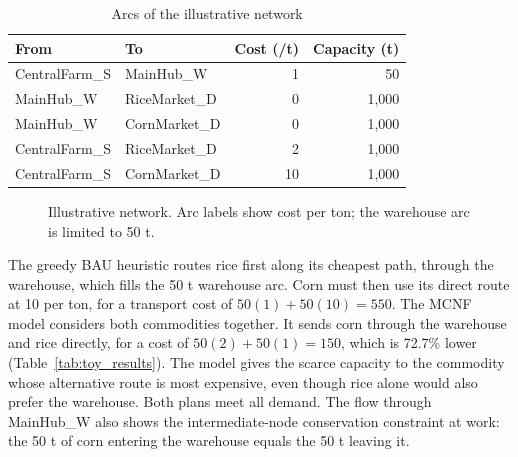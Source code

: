 \documentclass{icsthesis}
\begin{document}
\begin{mainmatter}
\begin{table}[H]
\caption{Arcs of the illustrative network}
\label{tab:toy_edges}
\centering
\small
\setlength{\tabcolsep}{3pt}
\begin{tabular}{llrr}
\hline
From & To & Cost (/t) & Capacity (t) \\
\hline
CentralFarm\_S & MainHub\_W & 1 & 50 \\
MainHub\_W & RiceMarket\_D & 0 & 1,000 \\
MainHub\_W & CornMarket\_D & 0 & 1,000 \\
CentralFarm\_S & RiceMarket\_D & 2 & 1,000 \\
CentralFarm\_S & CornMarket\_D & 10 & 1,000 \\
\hline
\end{tabular}
\end{table}

\begin{figure}[H]
\centering
{}
\caption{Illustrative network. Arc labels show cost per ton; the warehouse arc is limited to 50 t.}
\label{fig:toy}
\end{figure}

The greedy BAU heuristic routes rice first along its cheapest path, through the warehouse, which fills the 50 t warehouse arc. Corn must then use its direct route at 10 per ton, for a transport cost of $50(1) + 50(10) = 550$. The MCNF model considers both commodities together. It sends corn through the warehouse and rice directly, for a cost of $50(2) + 50(1) = 150$, which is 72.7\% lower (Table~\ref{tab:toy_results}). The model gives the scarce capacity to the commodity whose alternative route is most expensive, even though rice alone would also prefer the warehouse. Both plans meet all demand. The flow through MainHub\_W also shows the intermediate-node conservation constraint at work: the 50 t of corn entering the warehouse equals the 50 t leaving it.


\end{mainmatter}
\end{document}
